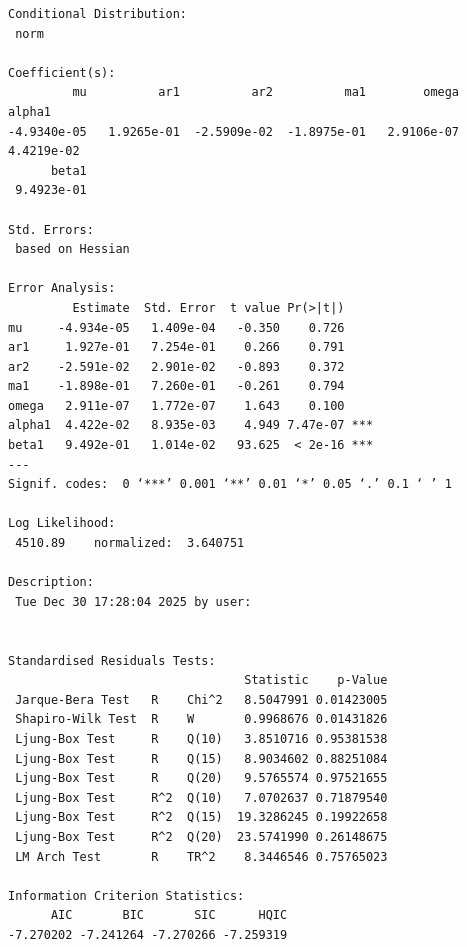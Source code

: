 \documentclass[a4paper]{article}
\begin{document}
\begin{verbatim}
Conditional Distribution:
 norm 

Coefficient(s):
         mu          ar1          ar2          ma1        omega       alpha1  
-4.9340e-05   1.9265e-01  -2.5909e-02  -1.8975e-01   2.9106e-07   4.4219e-02  
      beta1  
 9.4923e-01  

Std. Errors:
 based on Hessian 

Error Analysis:
         Estimate  Std. Error  t value Pr(>|t|)    
mu     -4.934e-05   1.409e-04   -0.350    0.726    
ar1     1.927e-01   7.254e-01    0.266    0.791    
ar2    -2.591e-02   2.901e-02   -0.893    0.372    
ma1    -1.898e-01   7.260e-01   -0.261    0.794    
omega   2.911e-07   1.772e-07    1.643    0.100    
alpha1  4.422e-02   8.935e-03    4.949 7.47e-07 ***
beta1   9.492e-01   1.014e-02   93.625  < 2e-16 ***
---
Signif. codes:  0 ‘***’ 0.001 ‘**’ 0.01 ‘*’ 0.05 ‘.’ 0.1 ‘ ’ 1

Log Likelihood:
 4510.89    normalized:  3.640751 

Description:
 Tue Dec 30 17:28:04 2025 by user:  


Standardised Residuals Tests:
                                 Statistic    p-Value
 Jarque-Bera Test   R    Chi^2   8.5047991 0.01423005
 Shapiro-Wilk Test  R    W       0.9968676 0.01431826
 Ljung-Box Test     R    Q(10)   3.8510716 0.95381538
 Ljung-Box Test     R    Q(15)   8.9034602 0.88251084
 Ljung-Box Test     R    Q(20)   9.5765574 0.97521655
 Ljung-Box Test     R^2  Q(10)   7.0702637 0.71879540
 Ljung-Box Test     R^2  Q(15)  19.3286245 0.19922658
 Ljung-Box Test     R^2  Q(20)  23.5741990 0.26148675
 LM Arch Test       R    TR^2    8.3446546 0.75765023

Information Criterion Statistics:
      AIC       BIC       SIC      HQIC 
-7.270202 -7.241264 -7.270266 -7.259319
\end{verbatim}
\end{document}
